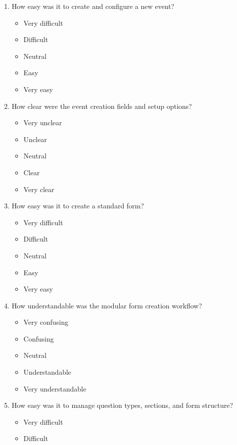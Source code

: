 \documentclass[12pt]{article}
\begin{document}
\begin{enumerate}
    \item How easy was it to create and configure a new event?
    \begin{itemize}[label=$\circ$]
        \item Very difficult
        \item Difficult
        \item Neutral
        \item Easy
        \item Very easy
    \end{itemize}
    \item How clear were the event creation fields and setup options?
    \begin{itemize}[label=$\circ$]
        \item Very unclear
        \item Unclear
        \item Neutral
        \item Clear
        \item Very clear
    \end{itemize}
    \item How easy was it to create a standard form?
    \begin{itemize}[label=$\circ$]
        \item Very difficult
        \item Difficult
        \item Neutral
        \item Easy
        \item Very easy
    \end{itemize}
    \item How understandable was the modular form creation workflow?
    \begin{itemize}[label=$\circ$]
        \item Very confusing
        \item Confusing
        \item Neutral
        \item Understandable
        \item Very understandable
    \end{itemize}
    \item How easy was it to manage question types, sections, and form structure?
    \begin{itemize}[label=$\circ$]
        \item Very difficult
        \item Difficult

\end{itemize}
\end{enumerate}
\end{document}
